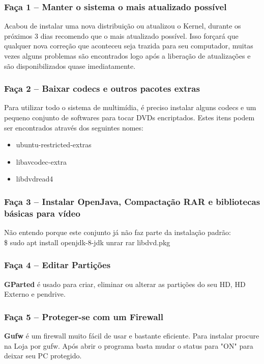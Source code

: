 \subsubsection{Faça 1 – Manter o sistema o mais atualizado possível}
Acabou de instalar uma nova distribuição ou atualizou o Kernel, durante os próximos 3 dias recomendo que o mais atualizado possível. Isso forçará que qualquer nova correção que aconteceu seja trazida para seu computador, muitas vezes alguns problemas são encontrados logo após a liberação de atualizações e são disponibilizados quase imediatamente.

\subsubsection{Faça 2 – Baixar codecs e outros pacotes extras}
Para utilizar todo o sistema de multimídia, é preciso instalar alguns codecs e um pequeno conjunto de softwares para tocar DVDs encriptados. Estes itens podem ser encontrados através dos seguintes nomes: \vspace{-1em}
\begin{itemize}[noitemsep]
 \item ubuntu-restricted-extras
 \item libavcodec-extra 
 \item libdvdread4 
\end{itemize}

\subsubsection{Faça 3 – Instalar OpenJava, Compactação RAR e bibliotecas básicas para vídeo}
Não entendo porque este conjunto já não faz parte da instalação padrão: \\
{\ttfamily\$ sudo apt install openjdk-8-jdk unrar rar libdvd.pkg}

\subsubsection{Faça 4 – Editar Partições}
\textbf{GParted} é usado para criar, eliminar ou alterar as partições do seu HD, HD Externo e pendrive.

\subsubsection{Faça 5 – Proteger-se com um Firewall}
\textbf{Gufw} é um firewall muito fácil de usar e bastante eficiente. Para instalar procure na Loja por gufw. Após abrir o programa basta mudar o status para "ON" para deixar seu PC protegido.

